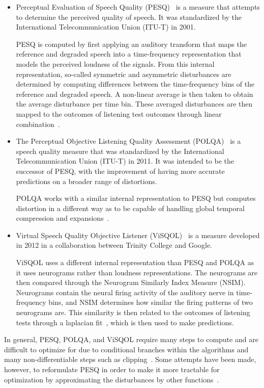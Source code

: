 \begin{itemize}
    \item 
    Perceptual Evaluation of Speech Quality (PESQ)~\cite{rix2001perceptual} is a measure that attempts to determine the perceived quality of speech.
    It was standardized by the International Telecommunication Union (ITU-T) in 2001.

    PESQ is computed by first applying an auditory transform that maps the reference and degraded speech into a time-frequency representation that models the perceived loudness of the signals.
    From this internal representation, so-called symmetric and asymmetric disturbances are determined by computing differences between the time-frequency bins of the reference and degraded speech. 
    A non-linear average is then taken to obtain the average disturbance per time bin.
    These averaged disturbances are then mapped to the outcomes of listening test outcomes through linear 
    combination~\cite{rix2001perceptual}.

    \item
    The Perceptual Objective Listening Quality Assessment (POLQA)~\cite{beerends2013perceptual} is a speech quality measure that was standardized by the International Telecommunication Union (ITU-T) in 2011. 
    It was intended to be the successor of PESQ, with the improvement of having more accurate predictions on a broader range of distortions.

    POLQA works with a similar internal representation to PESQ but computes distortion in a different way as to be capable of handling global temporal compression and expansions~\cite{beerends2013perceptual}.

    \item
    Virtual Speech Quality Objective Listener (ViSQOL)~\cite{hines2012visqol,chinen2020visqol} is a measure developed in 2012 in a collaboration between Trinity College and Google.

    ViSQOL uses a different internal representation than PESQ and POLQA as it uses neurograms rather than loudness representations. 
    The neurograms are then compared through the Neurogram Similarly Index Measure (NSIM).
    Neurograms contain the neural firing activity of the auditory nerve in time-frequency bins, and NSIM determines how similar the firing patterns of two neurograms are.
    This similarity is then related to the outcomes of listening tests through a laplacian fit~\cite{hines2012visqol}, which is then used to make predictions.

\end{itemize}
In general, PESQ, POLQA, and ViSQOL require many steps to compute and are difficult to optimize for due to 
conditional branches within the algorithms and many non-differentiable steps such as clipping~\cite{rix2001perceptual,beerends2013perceptual,hines2012visqol}. 
Some attempts have been made, however, to reformulate PESQ in order to make it more tractable for optimization 
by approximating the disturbances by other functions~\cite{kim2019end}.

